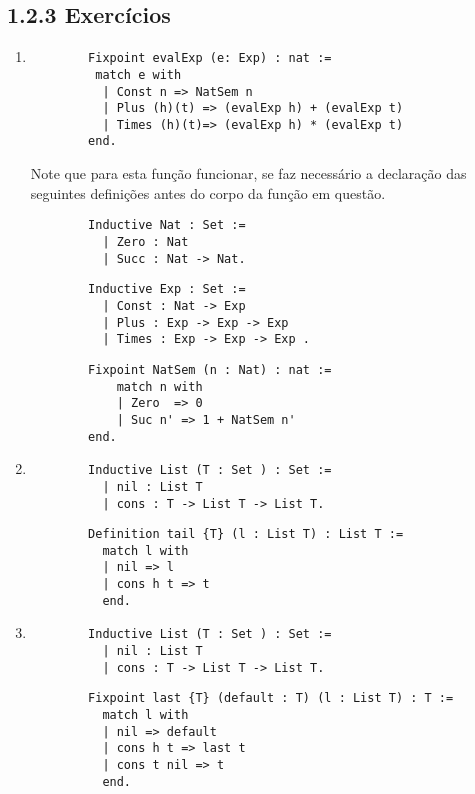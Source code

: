 \subsection{1.2.3 Exerc\'icios}

	\begin{enumerate}
		\item

		\begin{lstlisting}
		Fixpoint evalExp (e: Exp) : nat :=
	     match e with
	      | Const n => NatSem n
	      | Plus (h)(t) => (evalExp h) + (evalExp t)
	      | Times (h)(t)=> (evalExp h) * (evalExp t)
	    end.
	    \end{lstlisting}	
		Note que para esta fun\c{c}\~ao funcionar, se faz necess\'ario a declara\c{c}\~ao das seguintes defini\c{c}\~oes antes do corpo da fun\c{c}\~ao em quest\~ao.
	
		\begin{lstlisting}
		Inductive Nat : Set :=
		  | Zero : Nat           
		  | Succ : Nat -> Nat.
		\end{lstlisting}
		
		\begin{lstlisting}
		Inductive Exp : Set :=
		  | Const : Nat -> Exp
		  | Plus : Exp -> Exp -> Exp
		  | Times : Exp -> Exp -> Exp .
		\end{lstlisting}
				
		\begin{lstlisting}
		Fixpoint NatSem (n : Nat) : nat :=
			match n with
			| Zero  => 0
			| Suc n' => 1 + NatSem n'
		end.
		\end{lstlisting}		
				
				
		\item 
		\begin{lstlisting}
		Inductive List (T : Set ) : Set :=
	 	  | nil : List T
		  | cons : T -> List T -> List T.
		\end{lstlisting}
		
		\begin{lstlisting}
		Definition tail {T} (l : List T) : List T :=
		  match l with
		  | nil => l
		  | cons h t => t
		  end.
		\end{lstlisting}
		
		\item 
		
		\begin{lstlisting}
		Inductive List (T : Set ) : Set :=
		  | nil : List T
		  | cons : T -> List T -> List T.
		\end{lstlisting}
		
		
		\begin{lstlisting}
		Fixpoint last {T} (default : T) (l : List T) : T :=
		  match l with
		  | nil => default
		  | cons h t => last t
		  | cons t nil => t
		  end.
		\end{lstlisting}
		
	\end{enumerate}

